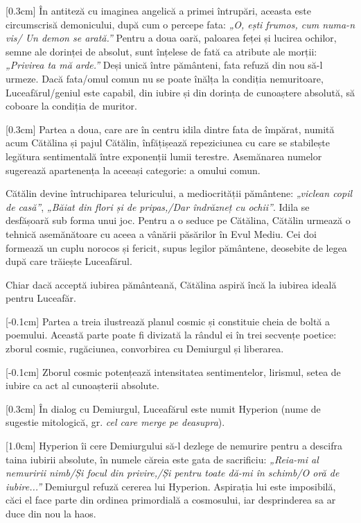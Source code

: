[0.3cm]
În antiteză cu imaginea angelică a primei întrupări, aceasta este circumscrisă demonicului, după cum o percepe fata: \textit{„O, ești frumos, cum numa-n vis/ Un demon se arată.”} Pentru a doua oară, paloarea feței și lucirea ochilor, semne ale dorinței de absolut, sunt înțelese de fată ca atribute ale morții: \textit{„Privirea ta mă arde.”} Deși unică între pământeni, fata refuză din nou să-l urmeze. Dacă fata/omul comun nu se poate înălța la condiția nemuritoare, Luceafărul/geniul este capabil, din iubire și din dorința de cunoaștere absolută, să coboare la condiția de muritor.

[0.3cm]
Partea a doua, care are în centru idila dintre fata de împărat, numită acum Cătălina și pajul Cătălin, înfățișează repeziciunea cu care se stabilește legătura sentimentală între exponenții lumii terestre. Asemănarea numelor sugerează apartenența la aceeași categorie: a omului comun.

Cătălin devine întruchiparea teluricului, a mediocrității pământene: \textit{„viclean copil de casă”}, \textit{„Băiat din flori și de pripas,/Dar îndrăzneț cu ochii”}. Idila se desfășoară sub forma unui joc. Pentru a o seduce pe Cătălina, Cătălin urmează o tehnică asemănătoare cu aceea a vânării păsărilor în Evul Mediu. Cei doi formează un cuplu norocos și fericit, supus legilor pământene, deosebite de legea după care trăiește Luceafărul.

Chiar dacă acceptă iubirea pământeană, Cătălina aspiră încă la iubirea ideală pentru Luceafăr.

[-0.1cm]
Partea a treia ilustrează planul cosmic și constituie cheia de boltă a poemului. Această parte poate fi divizată la rândul ei în trei secvențe poetice: zborul cosmic, rugăciunea, convorbirea cu Demiurgul și liberarea.

[-0.1cm]
Zborul cosmic potențează intensitatea sentimentelor, lirismul, setea de iubire ca act al cunoașterii absolute.

[0.3cm]
În dialog cu Demiurgul, Luceafărul este numit Hyperion (nume de sugestie mitologică, gr. \textit{cel care merge pe deasupra}).

[1.0cm]
Hyperion îi cere Demiurgului să-l dezlege de nemurire pentru a descifra taina iubirii absolute, în numele căreia este gata de sacrificiu: \textit{„Reia-mi al nemuririi nimb/Și focul din privire,/Și pentru toate dă-mi în schimb/O oră de iubire...”} Demiurgul refuză cererea lui Hyperion. Aspirația lui este imposibilă, căci el face parte din ordinea primordială a cosmosului, iar desprinderea sa ar duce din nou la haos.

